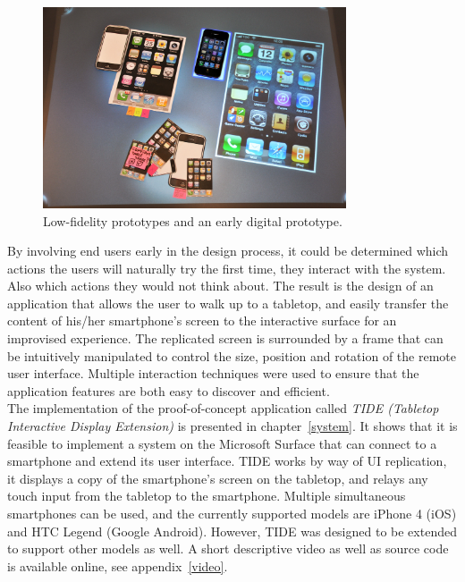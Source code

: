\begin{figure}[htb]
  \centering
    \includegraphics[width=0.8\textwidth]{images/paperprot2}
  \caption{Low-fidelity prototypes and an early digital prototype.}
  \label{fig:vortex}
\end{figure}

By involving end users early in the design process, it could be determined which actions the users will naturally try the first time, they interact with the system.
Also which actions they would not think about.
The result is the design of an application that allows the user to walk up to a tabletop, and easily transfer the content of his/her smartphone's screen to the interactive surface for an improvised experience.
The replicated screen is surrounded by a frame that can be intuitively manipulated to control the size, position and rotation of the remote user interface.
Multiple interaction techniques were used to ensure that the application features are both easy to discover and efficient.
\\
\linebreak
The implementation of the proof-of-concept application called \emph{TIDE (Tabletop Interactive Display Extension)} is presented in chapter~\ref{system}.
It shows that it is feasible to implement a system on the Microsoft Surface that can connect to a smartphone and extend its user interface.
TIDE works by way of UI replication, it displays a copy of the smartphone's screen on the tabletop, and relays any touch input from the tabletop to the smartphone.
Multiple simultaneous smartphones can be used, and the currently supported models are iPhone 4 (iOS) and HTC Legend (Google Android).
However, TIDE was designed to be extended to support other models as well.
A short descriptive video as well as source code is available online, see appendix~\ref{video}.

